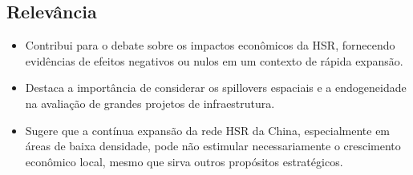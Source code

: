 \documentclass[12pt]{article}
\begin{document}
\subsection*{Relevância}
\begin{itemize}
    \item Contribui para o debate sobre os impactos econômicos da HSR, fornecendo evidências de efeitos negativos ou nulos em um contexto de rápida expansão.
    \item Destaca a importância de considerar os spillovers espaciais e a endogeneidade na avaliação de grandes projetos de infraestrutura.
    \item Sugere que a contínua expansão da rede HSR da China, especialmente em áreas de baixa densidade, pode não estimular necessariamente o crescimento econômico local, mesmo que sirva outros propósitos estratégicos.
\end{itemize}
\end{document}
